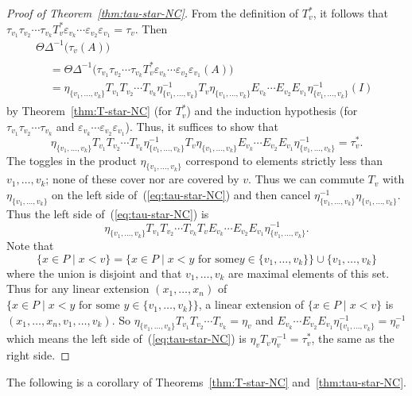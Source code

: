 \documentclass[10pt]{amsart}
\theoremstyle{definition}
\newcommand{\e}{\varepsilon}
\newcommand{\up}{\Delta}
\begin{document}
\begin{proof}[Proof of Theorem~\ref{thm:tau-star-NC}]
From the definition of $T_v^*$, it follows that $\tau_{v_1}\tau_{v_2}\cdots \tau_{v_k} T_v^* \e_{v_k}\cdots\e_{v_2} \e_{v_1} 
=\tau_v$.
Then
\begin{multline*}
 \Theta\up^{-1}\big(\tau_v(A)\big)\\
\begin{aligned}
 &= 
\Theta\up^{-1}\big(\tau_{v_1}\tau_{v_2}\cdots \tau_{v_k} T_v^* \e_{v_k}\cdots\e_{v_2} \e_{v_1} (A)\big)\\
&=
\eta_{\{v_1,\dots,v_k\}} T_{v_1}T_{v_2}\cdots T_{v_k} \eta_{\{v_1,\dots,v_k\}}^{-1} T_v \eta_{\{v_1,\dots,v_k\}} E_{v_k}\cdots E_{v_2}E_{v_1} \eta_{\{v_1,\dots,v_k\}}^{-1}(I)
\end{aligned}
\end{multline*}
by Theorem~\ref{thm:T-star-NC} (for $T_v^*$) and the induction hypothesis (for $\tau_{v_1}\tau_{v_2}\cdots \tau_{v_k}$ and
$\e_{v_k}\cdots\e_{v_2} \e_{v_1}$). Thus, it suffices to show that
\begin{equation}\label{eq:tau-star-NC}
\eta_{\{v_1,\dots,v_k\}} T_{v_1}T_{v_2}\cdots T_{v_k} \eta_{\{v_1,\dots,v_k\}}^{-1} T_v \eta_{\{v_1,\dots,v_k\}} E_{v_k}\cdots E_{v_2}E_{v_1} \eta_{\{v_1,\dots,v_k\}}^{-1}=\tau_v^*.
\end{equation}
The toggles in the product $\eta_{\{v_1,\dots,v_k\}}$ correspond to elements strictly less than $v_1,\dots,v_k$; none of these cover nor are covered by $v$. Thus
we can commute $T_v$ with $\eta_{\{v_1,\dots,v_k\}}$ on the left side of~(\ref{eq:tau-star-NC}) and then cancel $\eta_{\{v_1,\dots,v_k\}}^{-1} \eta_{\{v_1,\dots,v_k\}}$.
Thus the left side of~(\ref{eq:tau-star-NC}) is
\[
\eta_{\{v_1,\dots,v_k\}} T_{v_1}T_{v_2}\cdots T_{v_k} T_v E_{v_k} \cdots E_{v_2}E_{v_1} \eta_{\{v_1,\dots,v_k\}}^{-1}.
\]
Note that 
\[
\{x\in P \;|\; x<v\}=\{x\in P \;|\; x<y \text{ for some
}y\in\{v_1,\dots,v_k\}\}\cup \{v_1,\dots,v_k\}
\] 
where the union is disjoint and that
$v_1,\dots,v_k$ are maximal elements of this set. Thus for any linear extension
$(x_1,\dots,x_n)$ of $\big\{x\in P \;|\; x<y \text{ for some }y\in\{v_1,\dots,v_k\}\big\}$, a linear extension of 
$\{x\in P \;|\; x<v\}$ is
$(x_1,\dots,x_n,v_1,\dots,v_k)$.
So
$\eta_{\{v_1,\dots,v_k\}} T_{v_1}T_{v_2}\cdots T_{v_k}
=\eta_v$
and
$E_{v_k}\cdots E_{v_2}E_{v_1}\eta_{\{v_1,\dots,v_k\}}^{-1}
=\eta_v^{-1}$
which means the left side of~(\ref{eq:tau-star-NC}) is $\eta_v T_v \eta_v^{-1}= \tau_v^*$,
the same as the right side.
\end{proof}

The following is a corollary of Theorems~\ref{thm:T-star-NC} and~\ref{thm:tau-star-NC}.
\end{document}
